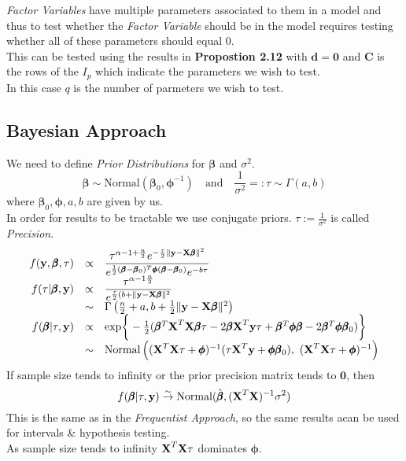 \documentclass[11pt,a4paper]{article}
\begin{document}
\textit{Factor Variables} have multiple parameters associated to them in a model and thus to test whether the \textit{Factor Variable} should be in the model requires testing whether all of these parameters should equal 0.\\
This can be tested using the results in \textbf{Propostion 2.12} with $\textbf{d}=\pmb0$ and $\textbf{C}$ is the rows of the $I_p$ which indicate the parameters we wish to test.\\
In this case $q$ is the number of parmeters we wish to test. 

\subsection{Bayesian Approach}

We need to define \textit{Prior Distributions} for $\pmb\beta$ and $\sigma^2$.
$$\pmb\beta\sim\text{Normal}(\pmb\beta_0,\pmb\phi^{-1})\quad\text{and}\quad\frac1{\sigma^2}=:\tau\sim\Gamma(a,b)$$
where $\pmb\beta_0,\pmb\phi,a,b$ are given by us.\\
\nb In order for results to be tractable we use conjugate priors. $\tau:=\frac1{\sigma^2}$ is called \textit{Precision}.\\

\[\begin{array}{rcl}
f(\textbf{y},\pmb\beta,\tau)&\propto&\displaystyle\frac{\tau^{\alpha-1+\frac{n}2}e^{-\frac\tau2\|\textbf{y}-\X\pmb\beta\|^2}}{e^{\frac12(\pmb\beta-\pmb\beta_0)^T\pmb\phi(\pmb\beta-\pmb\beta_0)}e^{-b\tau}}\\
f(\tau|\pmb\beta,\textbf{y})&\propto&\dfrac{\tau^{\alpha-1\frac{n}2}}{e^{\frac\tau2(b+\|\textbf{y}-\X\pmb\beta\|^2}}\\
&\sim&\Gamma\left(\frac{n}2+a,b+\frac12\|\textbf{y}-\X\pmb\beta\|^2\right)\\
f(\pmb\beta|\tau,\textbf{y})&\propto&\text{exp}\bigg\{-\frac12(\pmb\beta^T\X^T\X\pmb\beta\tau-2\pmb\beta\X^T\textbf{y}\tau+\pmb\beta^T\pmb\phi\pmb\beta-2\pmb\beta^T\pmb\phi\pmb\beta_0)\bigg\}\\
&\sim&\text{Normal}\left((\X^T\X\tau+\pmb\phi)^{-1}(\tau\X^T\textbf{y}+\pmb\phi\pmb\beta_0),\ (\X^T\X\tau+\pmb\phi)^{-1}\right)
\end{array}\]
If sample size tends to infinity or the prior precision matrix tends to $\pmb0$, then $$f(\pmb\beta|\tau,\textbf{y})\overset\sim\to\text{Normal}(\hat{\pmb\beta},(\textbf{X}^T\textbf{X})^{-1}\sigma^2)$$
This is the same as in the \textit{Frequentist Approach}, so the same results acan be used for intervals \& hypothesis testing.\\
\nb As sample size tends to infinity $\textbf{X}^T\textbf{X}\tau$ dominates $\pmb\phi$.\\
\end{document}
